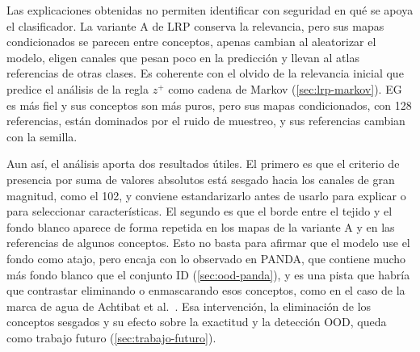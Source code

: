 Las explicaciones obtenidas no permiten identificar con seguridad en qué se apoya el clasificador. La variante A de LRP conserva la relevancia, pero sus mapas condicionados se parecen entre conceptos, apenas cambian al aleatorizar el modelo, eligen canales que pesan poco en la predicción y llevan al atlas referencias de otras clases. Es coherente con el olvido de la relevancia inicial que predice el análisis de la regla $z^{+}$ como cadena de Markov (\cref{sec:lrp-markov}). EG es más fiel y sus conceptos son más puros, pero sus mapas condicionados, con 128 referencias, están dominados por el ruido de muestreo, y sus referencias cambian con la semilla.

Aun así, el análisis aporta dos resultados útiles. El primero es que el criterio de presencia por suma de valores absolutos está sesgado hacia los canales de gran magnitud, como el 102, y conviene estandarizarlo antes de usarlo para explicar o para seleccionar características. El segundo es que el borde entre el tejido y el fondo blanco aparece de forma repetida en los mapas de la variante A y en las referencias de algunos conceptos. Esto no basta para afirmar que el modelo use el fondo como atajo, pero encaja con lo observado en PANDA, que contiene mucho más fondo blanco que el conjunto ID (\cref{sec:ood-panda}), y es una pista que habría que contrastar eliminando o enmascarando esos conceptos, como en el caso de la marca de agua de Achtibat et al.~\cite{achtibat2023}. Esa intervención, la eliminación de los conceptos sesgados y su efecto sobre la exactitud y la detección OOD, queda como trabajo futuro (\cref{sec:trabajo-futuro}).

\endinput

